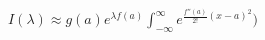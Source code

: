 \documentclass[preview]{standalone}
\begin{document}
\begin{align*}
I(\lambda) \approx \displaystyle g(a) e^{\lambda f(a)} \int_{-\infty}^{\infty} e^{\frac{f''(a)}{2!}(x - a)^2})
\end{align*}
\end{document}
